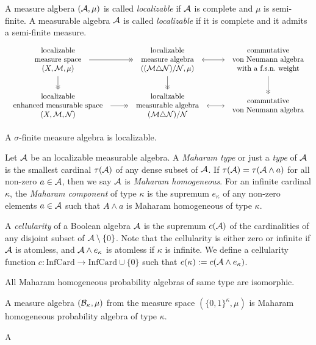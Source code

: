 \documentclass{../../large}
\begin{document}
\begin{prb}
A measure algbera $(\mathcal{A},\mu)$ is called \emph{localizable} if $\mathcal{A}$ is complete and $\mu$ is semi-finite.
A measurable algebra $\mathcal{A}$ is called \emph{localizable} if it is complete and it admits a semi-finite measure.
\[\begin{tikzcd}
\tab{localizable\\measure space\\$(X,\cM,\mu)$} \rar[->>]\dar[->>] &
\tab{localizable\\measure algebra\\$((\cM\triangle\cN)/\cN,\mu)$} \dar[->>]\rar[<->] &
\tab{commutative\\von Neumann algebra\\with a f.s.n.~weight} \dar[->>] \\
\tab{localizable\\enhanced measurable space\\$(X,\cM,\cN)$} \rar[->>] &
\tab{localizable\\measurable algebra\\$(\cM\triangle\cN)/\cN$} \rar[<->] &
\tab{commutative\\von Neumann algebra}
\end{tikzcd}\]

\begin{parts}
\item A $\sigma$-finite measure algebra is localizable.
\end{parts}
\end{prb}

\begin{prb}
Let $\mathcal{A}$ be an localizable measurable algebra.
A \emph{Maharam type} or just a \emph{type} of $\mathcal{A}$ is the smallest cardinal $\tau(\mathcal{A})$ of any dense subset of $\mathcal{A}$.
If $\tau(\mathcal{A})=\tau(\mathcal{A}\wedge a)$ for all non-zero $a\in\mathcal{A}$, then we say $\mathcal{A}$ is \emph{Maharam homogeneous}.
For an infinite cardinal $\kappa$, the \emph{Maharam component} of type $\kappa$ is the supremum $e_\kappa$ of any non-zero elements $a\in\mathcal{A}$ such that $A\wedge a$ is Maharam homogeneous of type $\kappa$.

A \emph{cellularity} of a Boolean algebra $\mathcal{A}$ is the supremum $c(\mathcal{A})$ of the cardinalities of any disjoint subset of $\mathcal{A}\setminus\{0\}$.
Note that the cellularity is either zero or infinite if $\mathcal{A}$ is atomless, and $\mathcal{A}\wedge e_\kappa$ is atomless if $\kappa$ is infinite.
We define a cellularity function $c:\mathrm{InfCard}\to\mathrm{InfCard}\cup\{0\}$ such that $c(\kappa):=c(\mathcal{A}\wedge e_\kappa)$.

\begin{parts}
\item 
\item All Maharam homogeneous probability algebras of same type are isomorphic.
\item A measure algebra $(\mathcal{B}_\kappa,\mu)$ from the measure space $(\{0,1\}^\kappa,\mu)$ is Maharam homogeneous probability algebra of type $\kappa$.
\item A
\end{parts}
\end{prb}
\end{document}
